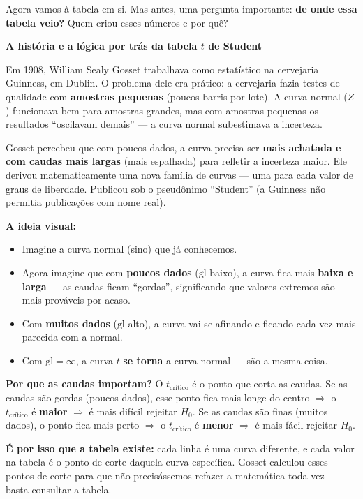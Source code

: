 Agora vamos à tabela em si. Mas antes, uma pergunta importante:
\textbf{de onde essa tabela veio?} Quem criou esses números e por quê?

\begin{SolvedBox}
\textbf{A história e a lógica por trás da tabela $t$ de Student}

Em 1908, William Sealy Gosset trabalhava como estatístico na cervejaria
Guinness, em Dublin. O problema dele era prático: a cervejaria fazia
testes de qualidade com \textbf{amostras pequenas} (poucos barris por lote).
A curva normal ($Z$) funcionava bem para amostras grandes, mas com
amostras pequenas os resultados ``oscilavam demais'' --- a curva normal
subestimava a incerteza.

Gosset percebeu que com poucos dados, a curva precisa ser \textbf{mais
achatada e com caudas mais largas} (mais espalhada) para refletir a
incerteza maior. Ele derivou matematicamente uma nova família de curvas
--- uma para cada valor de graus de liberdade. Publicou sob o pseudônimo
``Student'' (a Guinness não permitia publicações com nome real).

\textbf{A ideia visual:}
\begin{itemize}
  \item Imagine a curva normal (sino) que já conhecemos.
  \item Agora imagine que com \textbf{poucos dados} ($\text{gl}$ baixo),
  a curva fica mais \textbf{baixa e larga} --- as caudas ficam ``gordas'',
  significando que valores extremos são mais prováveis por acaso.
  \item Com \textbf{muitos dados} ($\text{gl}$ alto), a curva vai se
  afinando e ficando cada vez mais parecida com a normal.
  \item Com $\text{gl} = \infty$, a curva $t$ \textbf{se torna} a
  curva normal --- são a mesma coisa.
\end{itemize}

\textbf{Por que as caudas importam?}
O $t_{\text{crítico}}$ é o ponto que corta as caudas.
Se as caudas são gordas (poucos dados), esse ponto fica mais longe do
centro $\Rightarrow$ o $t_{\text{crítico}}$ é \textbf{maior}
$\Rightarrow$ é mais difícil rejeitar $H_0$.
Se as caudas são finas (muitos dados), o ponto fica mais perto
$\Rightarrow$ o $t_{\text{crítico}}$ é \textbf{menor}
$\Rightarrow$ é mais fácil rejeitar $H_0$.

\textbf{É por isso que a tabela existe:} cada linha é uma curva diferente,
e cada valor na tabela é o ponto de corte daquela curva específica.
Gosset calculou esses pontos de corte para que não precisássemos refazer
a matemática toda vez --- basta consultar a tabela.
\end{SolvedBox}

